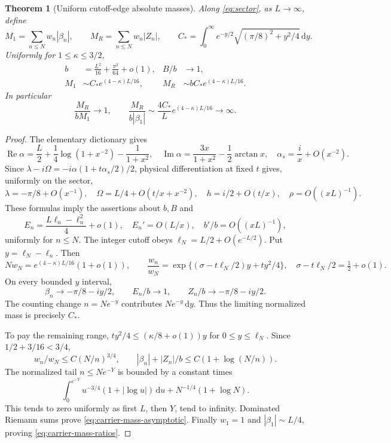 \documentclass[11pt]{article}
\newtheorem{theorem}{Theorem}[section]
\theoremstyle{definition}
\theoremstyle{remark}
\newcommand{\dd}{\,\mathrm d}
\newcommand{\Rea}{\operatorname{Re}}
\newcommand{\Ima}{\operatorname{Im}}
\begin{document}
\begin{theorem}[Uniform cutoff-edge absolute masses]
\label{thm:carrier-edge-mass}
Along \eqref{eq:sector}, as $L\to\infty$, define
\[
 M_1=\sum_{n\le N}w_n|\beta_n|,\qquad
 M_R=\sum_{n\le N}w_n|Z_n|,
 \qquad
 C_*=\int_0^\infty e^{-y/2}
            \sqrt{(\pi/8)^2+y^2/4}\dd y.
\]
Uniformly for $1\le\kappa\le3/2$,
\begin{align}
 b&=\frac{L^2}{16}+\frac{\pi^2}{64}+o(1),&
 B/b&\longrightarrow1,\nonumber\\
 M_1&\sim C_*e^{(4-\kappa)L/16},&
 M_R&\sim bC_*e^{(4-\kappa)L/16}.
 \label{eq:carrier-mass-asymptotic}
\end{align}
In particular
\begin{equation}
 \frac{M_R}{bM_1}\longrightarrow1,\qquad
 \frac{M_R}{b|\beta_1|}
 \sim\frac{4C_*}{L}e^{(4-\kappa)L/16}\longrightarrow\infty.
 \label{eq:carrier-mass-ratios}
\end{equation}
\end{theorem}
\begin{proof}
The elementary dictionary gives
\[
 \Rea\alpha=\frac L2+\frac14\log(1+x^{-2})-\frac1{1+x^2},
 \quad
 \Ima\alpha=\frac{3x}{1+x^2}-\frac12\arctan x,
 \quad \alpha_s=\frac i x+O(x^{-2}).
\]
Since $\lambda-i\Omega=-i\alpha(1+t\alpha_s/2)/2$, physical
differentiation at fixed $t$ gives, uniformly on the sector,
\[
 \lambda=-\pi/8+O(x^{-1}),\quad
 \Omega=L/4+O(t/x+x^{-2}),\quad h=i/2+O(t/x),
 \quad \rho=O((xL)^{-1}).
\]
These formulas imply the assertions about $b,B$ and
\[
 E_n=\frac{L\ell_n-\ell_n^2}{4}+o(1),\quad
 E_n'=O(L/x),\quad b'/b=O((xL)^{-1}),
\]
uniformly for $n\le N$. The integer cutoff obeys
$\ell_N=L/2+O(e^{-L/2})$. Put $y=\ell_N-\ell_n$.
Then
\[
 Nw_N=e^{(4-\kappa)L/16}(1+o(1)),\qquad
 \frac{w_n}{w_N}
 =\exp\{(\sigma-t\ell_N/2)y+ty^2/4\},
 \quad \sigma-t\ell_N/2=\tfrac12+o(1).
\]
On every bounded $y$ interval,
\[
 \beta_n\longrightarrow-\pi/8-iy/2,\qquad
 E_n/b\longrightarrow1,\qquad Z_n/b\longrightarrow-\pi/8-iy/2.
\]
The counting change $n=Ne^{-y}$ contributes $Ne^{-y}\dd y$.
Thus the limiting normalized mass is precisely $C_*$.

To pay the remaining range, $ty^2/4\le(\kappa/8+o(1))y$
for $0\le y\le\ell_N$. Since $1/2+3/16<3/4$,
\[
 w_n/w_N\le C(N/n)^{3/4},\qquad
 |\beta_n|+|Z_n|/b\le C(1+\log(N/n)).
\]
The normalized tail $n\le Ne^{-Y}$ is bounded by a constant times
\[
 \int_0^{e^{-Y}}u^{-3/4}(1+|\log u|)\dd u
       +N^{-1/4}(1+\log N).
\]
This tends to zero uniformly as first $L$, then $Y$, tend to infinity.
Dominated Riemann sums prove \eqref{eq:carrier-mass-asymptotic}.
Finally $w_1=1$ and $|\beta_1|\sim L/4$, proving
\eqref{eq:carrier-mass-ratios}.
\end{proof}
\end{document}
